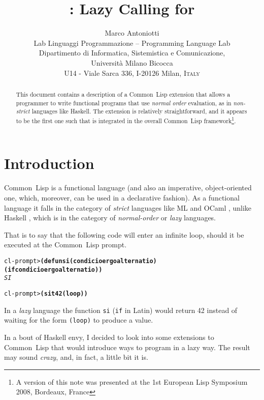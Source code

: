 \documentclass[fleqn,10pt]{article}
\title{
\LARGE{\bfseries \CLAZY{}: Lazy Calling for \CL{}}}
\author{
Marco Antoniotti\\
\small Lab Linguaggi Programmazione -- Programming Language Lab \PLL{}\\
\small Dipartimento di Informatica, Sistemistica e Comunicazione,\\
\small Universit\`{a} Milano Bicocca\\
\small U14 - Viale Sarca 336, I-20126 Milan, \textsc{Italy}}
\date{}
\newcommand{\CL}{\textsf{Common~Lisp}}
\newcommand{\CLAZY}{\textsf{CLAZY}}
\newcommand{\code}[1]{\texttt{#1}}
\newcommand{\PLL}{$\mathbf{\mathsf{<\mathrm{LLP}\;\;\Pi\Lambda\Lambda>}}$}
\begin{document}
\pagestyle{empty}

\maketitle

\begin{abstract}
This document contains a description of a \CL{} extension that allows
a programmer to write functional programs that use \emph{normal order}
evaluation, as in \emph{non-strict} languages like Haskell.  The
extension is relatively straightforward, and it appears to be the
first one such that is integrated in the overall \CL{}
framework\footnote{A version of this note was presented at the
  1st European Lisp Symposium 2008, Bordeaux, France}.
\end{abstract}


\rhead[]{\textit{\CLAZY{}: Lazy Calling\ldots}}
\chead[]{\PLL}



\pagestyle{fancy}

\section{Introduction}

\CL{} is a functional language (and also an imperative,
object-oriented one, which, moreover, can be used in a declarative
fashion).  As a functional language it falls in the category of
\emph{strict} languages like ML \cite{milner97:_def_standard_ml} and
OCaml \cite{leroy14:_ocaml}, unlike Haskell \cite{Haskell2010}, which
is in the category of \emph{normal-order} or \emph{lazy} languages.

That is to say that the following code will enter an infinite loop,
should it be executed at the \CL{} prompt.
\begin{alltt}

    cl-prompt> \textbf{(defun si (condicio ergo alternatio)
                  (if condicio ergo alternatio))}
    \textit{SI}

    cl-prompt> \textbf{(si t 42 (loop))}
\end{alltt}
In a \emph{lazy} language the function \code{si} (\code{if}
in Latin) would return 42 instead of waiting for the form
\code{(loop)} to produce a value.

In a bout of Haskell envy, I decided to look into some extensions to
\CL{} that would introduce ways to program in a lazy way. The result
may sound \emph{crazy}, and, in fact, a little bit it is.
\end{document}
